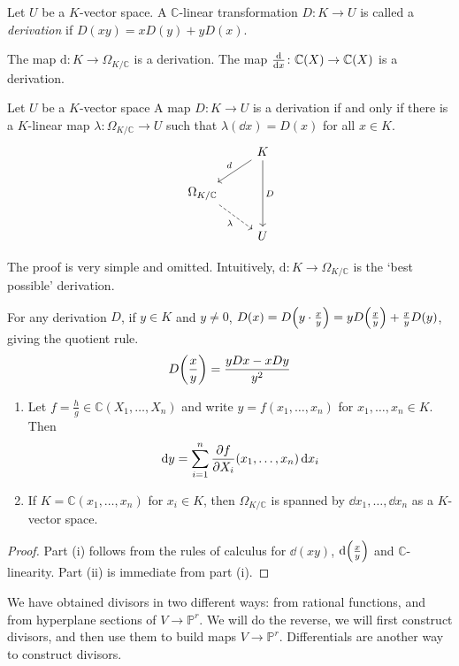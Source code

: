 \begin{definition}
    Let \( U \) be a \( K \)-vector space.
    A \( \mathbb C \)-linear transformation \( D \colon K \to U \) is called a \emph{derivation} if \( D(xy) = xD(y) + yD(x) \).
\end{definition}
\begin{example}
    The map \( \mathrm{d} \colon K \to \Omega_{K/\mathbb C} \) is a derivation.
    The map \( \dv{x} \colon \mathbb C(X) \to \mathbb C(X) \) is a derivation.
\end{example}
\begin{lemma}
    Let \( U \) be a \( K \)-vector space
    A map \( D \colon K \to U \) is a derivation if and only if there is a \( K \)-linear map \( \lambda \colon \Omega_{K/\mathbb C} \to U \) such that \( \lambda(\dd{x}) = D(x) \) for all \( x \in K \).
    \[\begin{tikzcd}
        & K \\
        {\Omega_{K/\mathbb C}} \\
        & U
        \arrow["d"', from=1-2, to=2-1]
        \arrow["\lambda"', dashed, from=2-1, to=3-2]
        \arrow["D", from=1-2, to=3-2]
    \end{tikzcd}\]
\end{lemma}
The proof is very simple and omitted.
Intuitively, \( \mathrm{d} \colon K \to \Omega_{K/\mathbb C} \) is the `best possible' derivation.
\begin{remark}
    For any derivation \( D \), if \( y \in K \) and \( y \neq 0 \), \( D(x) = D\qty(y \cdot \frac{x}{y}) = yD\qty(\frac{x}{y}) + \frac{x}{y} D(y) \), giving the quotient rule.
    \[ D\qty(\frac{x}{y}) = \frac{yDx - xDy}{y^2} \]
\end{remark}
\begin{lemma}
    \begin{enumerate}
        \item Let \( f = \frac{h}{g} \in \mathbb C(X_1, \dots, X_n) \) and write \( y = f(x_1, \dots, x_n) \) for \( x_1, \dots, x_n \in K \).
        Then
        \[ \dd{y} = \sum_{i=1}^n \pdv{f}{X_i}\qty(x_1, \dots, x_n) \dd{x_i} \]
        \item If \( K = \mathbb C(x_1, \dots, x_n) \) for \( x_i \in K \), then \( \Omega_{K/\mathbb C} \) is spanned by \( \dd{x_1}, \dots, \dd{x_n} \) as a \( K \)-vector space.
    \end{enumerate}
\end{lemma}
\begin{proof}
    Part (i) follows from the rules of calculus for \( \dd{(xy)} \), \( \dd{\qty(\frac{x}{y})} \) and \( \mathbb C \)-linearity.
    Part (ii) is immediate from part (i).
\end{proof}
We have obtained divisors in two different ways: from rational functions, and from hyperplane sections of \( V \to \mathbb P^r \).
We will do the reverse, we will first construct divisors, and then use them to build maps \( V \to \mathbb P^r \).
Differentials are another way to construct divisors.

